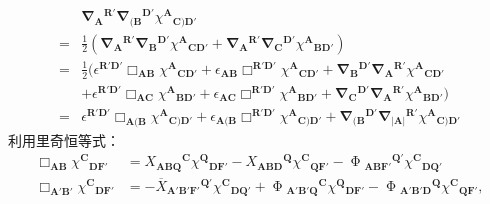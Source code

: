 \begin{equation*}
	\begin{aligned}
		& \mathbf{\nabla }{_{\boldsymbol{A}}}^{\boldsymbol{R} '}\mathbf{\nabla }{_{(\boldsymbol{B}}}^{\boldsymbol{D} '} \chi ^{\boldsymbol{A}}{}_{\boldsymbol{C})\boldsymbol{D} '}\\
		= & \frac{1}{2} (\mathbf{\nabla }{_{\boldsymbol{A}}}^{\boldsymbol{R} '}\mathbf{\nabla }{_{\boldsymbol{B}}}^{\boldsymbol{D} '} \chi ^{\boldsymbol{A}}{}_{\boldsymbol{CD} '} +\mathbf{\nabla }{_{\boldsymbol{A}}}^{\boldsymbol{R} '}\mathbf{\nabla }{_{\boldsymbol{C}}}^{\boldsymbol{D} '} \chi ^{\boldsymbol{A}}{}_{\boldsymbol{BD} '} )\\
		= & \frac{1}{2}( \epsilon ^{\boldsymbol{R} '\boldsymbol{D} '} \Box _{\boldsymbol{AB}} \chi ^{\boldsymbol{A}}{}_{\boldsymbol{CD} '} +\epsilon _{\boldsymbol{AB}} \Box ^{\boldsymbol{R} '\boldsymbol{D} '} \chi ^{\boldsymbol{A}}{}_{\boldsymbol{CD} '} +\mathbf{\nabla }{_{\boldsymbol{B}}}^{\boldsymbol{D} '}\mathbf{\nabla }{_{\boldsymbol{A}}}^{\boldsymbol{R} '} \chi ^{\boldsymbol{A}}{}_{\boldsymbol{CD} '}\\
		& +\epsilon ^{\boldsymbol{R} '\boldsymbol{D} '} \Box _{\boldsymbol{AC}} \chi ^{\boldsymbol{A}}{}_{\boldsymbol{BD} '} +\epsilon _{\boldsymbol{AC}} \Box ^{\boldsymbol{R} '\boldsymbol{D} '} \chi ^{\boldsymbol{A}}{}_{\boldsymbol{BD} '} +\mathbf{\nabla }{_{\boldsymbol{C}}}^{\boldsymbol{D} '}\mathbf{\nabla }{_{\boldsymbol{A}}}^{\boldsymbol{R} '} \chi ^{\boldsymbol{A}}{}_{\boldsymbol{BD} '})\\
		= & \epsilon ^{\boldsymbol{R} '\boldsymbol{D} '} \Box _{\boldsymbol{A}(\boldsymbol{B}} \chi ^{\boldsymbol{A}}{}_{\boldsymbol{C})\boldsymbol{D} '} +\epsilon _{\boldsymbol{A}(\boldsymbol{B}} \Box ^{\boldsymbol{R} '\boldsymbol{D} '} \chi ^{\boldsymbol{A}}{}_{\boldsymbol{C})\boldsymbol{D} '} +\mathbf{\nabla }{_{(\boldsymbol{B}}}^{\boldsymbol{D} '}\mathbf{\nabla }{_{|\boldsymbol{A} |}}^{\boldsymbol{R} '} \chi ^{\boldsymbol{A}}{}_{\boldsymbol{C})\boldsymbol{D} '}
	\end{aligned}
\end{equation*}
利用里奇恒等式：
\begin{equation*}
	\begin{aligned}
		\Box _{\boldsymbol{AB}} \chi ^{\boldsymbol{C}}{}_{\boldsymbol{DF} '} & =X{_{\boldsymbol{ABQ}}}^{\boldsymbol{C}} \chi ^{\boldsymbol{Q}}{}_{\boldsymbol{DF} '} -X{_{\boldsymbol{ABD}}}^{\boldsymbol{Q}} \chi ^{\boldsymbol{C}}{}_{\boldsymbol{QF} '} -\upPhi {_{\boldsymbol{ABF} '}}^{\boldsymbol{Q} '} \chi ^{\boldsymbol{C}}{}_{\boldsymbol{DQ} '}\\
		\Box _{\boldsymbol{A'B} '} \chi ^{\boldsymbol{C}}{}_{\boldsymbol{DF} '} & =-\overline{X}{_{\boldsymbol{A} '\boldsymbol{B} '\boldsymbol{F} '}}^{\boldsymbol{Q} '} \chi ^{\boldsymbol{C}}{}_{\boldsymbol{DQ} '} +\upPhi {_{\boldsymbol{A'B'Q}}}^{\boldsymbol{C}} \chi ^{\boldsymbol{Q}}{}_{\boldsymbol{DF} '} -\upPhi {_{\boldsymbol{A'B'D}}}^{\boldsymbol{Q}} \chi ^{\boldsymbol{C}}{}_{\boldsymbol{QF} '} ,
	\end{aligned}
\end{equation*}
